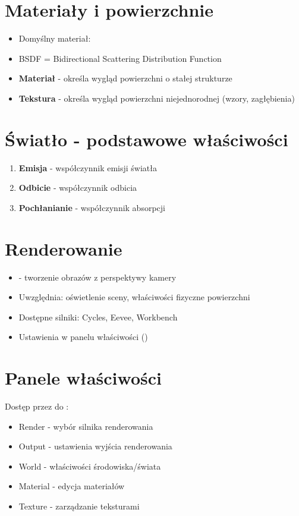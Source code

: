 \section{Materiały i powierzchnie}
\begin{itemize}[itemsep=2pt]
    \item Domyślny materiał: 
    \item BSDF = Bidirectional Scattering Distribution Function
    \item \textbf{Materiał} - określa wygląd powierzchni o stałej strukturze
    \item \textbf{Tekstura} - określa wygląd powierzchni niejednorodnej (wzory, zagłębienia)
\end{itemize}

\section{Światło - podstawowe właściwości}
\begin{enumerate}
    \item \textbf{Emisja} - współczynnik emisji światła
    \item \textbf{Odbicie} - współczynnik odbicia
    \item \textbf{Pochłanianie} - współczynnik absorpcji
\end{enumerate}

\section{Renderowanie}
\begin{itemize}[itemsep=2pt]
    \item {} - tworzenie obrazów z perspektywy kamery
    \item Uwzględnia: oświetlenie sceny, właściwości fizyczne powierzchni
    \item Dostępne silniki: Cycles, Eevee, Workbench
    \item Ustawienia w panelu właściwości ()
\end{itemize}

\section{Panele właściwości}
Dostęp przez  do :
\begin{itemize}[itemsep=2pt]
    \item Render - wybór silnika renderowania
    \item Output - ustawienia wyjścia renderowania
    \item World - właściwości środowiska/świata
    \item Material - edycja materiałów
    \item Texture - zarządzanie teksturami
\end{itemize}

